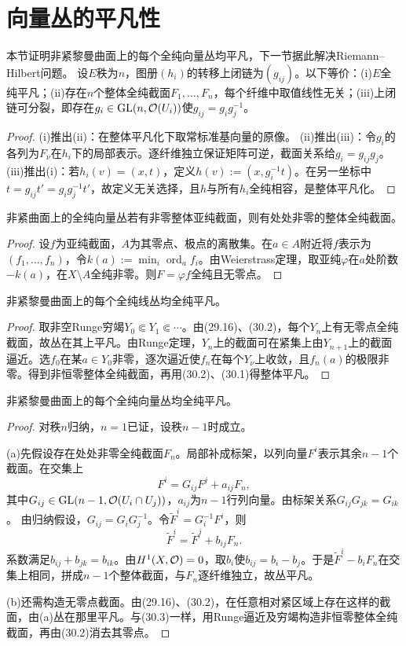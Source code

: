 \section{向量丛的平凡性}
本节证明非紧黎曼曲面上的每个全纯向量丛均平凡，下一节据此解决Riemann--Hilbert问题。
设$E$秩为$n$，图册$(h_i)$的转移上闭链为$(g_{ij})$。以下等价：(i)$E$全纯平凡；(ii)存在$n$个整体全纯截面$F_1,\ldots,F_n$，每个纤维中取值线性无关；(iii)上闭链可分裂，即存在$g_i\in\operatorname{GL}(n,\mathcal O(U_i))$使$g_{ij}=g_ig_j^{-1}$。
\begin{proof}
(i)推出(ii)：在整体平凡化下取常标准基向量的原像。
(ii)推出(iii)：令$g_i$的各列为$F_\nu$在$h_i$下的局部表示。逐纤维独立保证矩阵可逆，截面关系给$g_i=g_{ij}g_j$。
(iii)推出(i)：若$h_i(v)=(x,t)$，定义$h(v):=(x,g_i^{-1}t)$。在另一坐标中$t=g_{ij}t'=g_ig_j^{-1}t'$，故定义无关选择，且$h$与所有$h_i$全纯相容，是整体平凡化。
\end{proof}
非紧曲面上的全纯向量丛若有非零整体亚纯截面，则有处处非零的整体全纯截面。
\begin{proof}
设$f$为亚纯截面，$A$为其零点、极点的离散集。在$a\in A$附近将$f$表示为$(f_1,\ldots,f_n)$，令$k(a):=\min_i\operatorname{ord}_af_i$。由Weierstrass定理，取亚纯$\varphi$在$a$处阶数$-k(a)$，在$X\setminus A$全纯非零。则$F=\varphi f$全纯且无零点。
\end{proof}
非紧黎曼曲面上的每个全纯线丛均全纯平凡。
\begin{proof}
取非空Runge穷竭$Y_0\Subset Y_1\Subset\cdots$。由(29.16)、(30.2)，每个$Y_n$上有无零点全纯截面，故丛在其上平凡。由Runge定理，$Y_n$上的截面可在紧集上由$Y_{n+1}$上的截面逼近。选$f_0$在某$a\in Y_0$非零，逐次逼近使$f_n$在每个$Y_\nu$上收敛，且$f_n(a)$的极限非零。得到非恒零整体全纯截面，再用(30.2)、(30.1)得整体平凡。
\end{proof}
非紧黎曼曲面上的每个全纯向量丛均全纯平凡。
\begin{proof}
对秩$n$归纳，$n=1$已证，设秩$n-1$时成立。

(a)先假设存在处处非零全纯截面$F_n$。局部补成标架，以列向量$F^i$表示其余$n-1$个截面。在交集上
\begin{equation}F^i=G_{ij}F^j+a_{ij}F_n,\tag{1}\end{equation}
其中$G_{ij}\in\operatorname{GL}(n-1,\mathcal O(U_i\cap U_j))$，$a_{ij}$为$n-1$行列向量。由标架关系$G_{ij}G_{jk}=G_{ik}$。
由归纳假设，$G_{ij}=G_iG_j^{-1}$。令$\widetilde F^i=G_i^{-1}F^i$，则
\begin{equation}\widetilde F^i=\widetilde F^j+b_{ij}F_n.\tag{2}\end{equation}
系数满足$b_{ij}+b_{jk}=b_{ik}$。由$H^1(X,\mathcal O)=0$，取$b_i$使$b_{ij}=b_i-b_j$。于是$\widetilde F^i-b_iF_n$在交集上相同，拼成$n-1$个整体截面，与$F_n$逐纤维独立，故丛平凡。

(b)还需构造无零点截面。由(29.16)、(30.2)，在任意相对紧区域上存在这样的截面，由(a)丛在那里平凡。与(30.3)一样，用Runge逼近及穷竭构造非恒零整体全纯截面，再由(30.2)消去其零点。
\end{proof}
